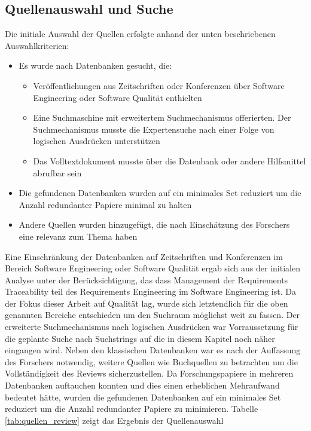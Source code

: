 
\subsection{Quellenauswahl und Suche}

Die initiale Auswahl der Quellen erfolgte anhand der unten beschriebenen Auswahlkriterien:

\begin{itemize}
    \item Es wurde nach Datenbanken gesucht, die:
        \begin{itemize}
            \item Veröffentlichungen aus Zeitschriften oder Konferenzen über Software Engineering oder Software Qualität enthielten
            \item Eine Suchmaschine mit erweitertem Suchmechanismus offerierten. Der Suchmechanismus musste die Expertensuche nach einer Folge von logischen Ausdrücken unterstützen
            \item Das Volltextdokument musste über die Datenbank oder andere Hilfsmittel abrufbar sein
        \end{itemize}
    \item Die gefundenen Datenbanken wurden auf ein minimales Set reduziert um die Anzahl redundanter Papiere minimal zu halten
    \item Andere Quellen wurden hinzugefügt, die nach Einschätzung des Forschers eine relevanz zum Thema haben
\end{itemize}

Eine Einschränkung der Datenbanken auf Zeitschriften und Konferenzen im Bereich Software Engineering oder Software Qualität ergab sich aus der initialen Analyse unter der Berücksichtigung, das dass Management der Requirements Traceability teil des Requirements Engineering im Software Engineering ist. Da der Fokus dieser Arbeit auf Qualität lag, wurde sich letztendlich für die oben genannten Bereiche entschieden um den Suchraum möglichst weit zu fassen. Der erweiterte Suchmechanismus nach logischen Ausdrücken war Vorraussetzung für die geplante Suche nach Suchstrings auf die in diesem Kapitel noch näher eingangen wird. Neben den klassischen Datenbanken war es nach der Auffassung des Forschers notwendig, weitere Quellen wie Buchquellen zu betrachten um die Vollständigkeit des Reviews sicherzustellen. Da Forschungspapiere in mehreren Datenbanken auftauchen konnten und dies einen erheblichen Mehraufwand bedeutet hätte, wurden die gefundenen Datenbanken auf ein minimales Set reduziert um die Anzahl redundanter Papiere zu minimieren. Tabelle \ref{tab:quellen_review} zeigt das Ergebnis der Quellenauswahl

